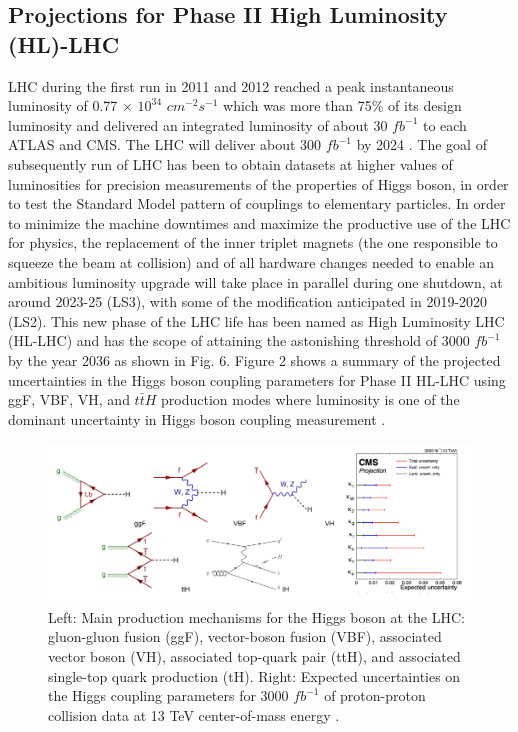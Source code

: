 \subsection{Projections for Phase II High Luminosity (HL)-LHC}
LHC during the first run in 2011 and 2012 reached a peak instantaneous luminosity of 0.77 $\times$ $10^{34}$ $cm^{-2}s^{-1}$ which was more than 75$\%$ of its design luminosity and delivered an integrated luminosity of about 30 $fb^{-1}$ to each ATLAS and CMS. The LHC will deliver about 300 $fb^{-1}$ by 2024 \cite{collaborations2019report}. The goal of subsequently run of LHC has been to obtain datasets at higher values of luminosities for precision measurements of the properties of Higgs boson, in order to test the Standard Model pattern of couplings to elementary particles. In order to minimize the machine downtimes and maximize the productive use of the LHC for physics, the replacement of the inner triplet magnets (the one responsible to squeeze the beam at collision) and  of  all  hardware  changes  needed  to  enable  an  ambitious  luminosity  upgrade  will  take  place in parallel during one shutdown, at around 2023-25 (LS3), with some of the modification anticipated in 2019-2020 (LS2). This new phase of the LHC life has been named as High Luminosity LHC (HL-LHC) and has the scope of attaining the astonishing threshold of 3000 $fb^{-1}$ by the year 2036 as shown in Fig. 6. Figure 2 shows a summary of the projected uncertainties in the Higgs boson coupling parameters for Phase II HL-LHC using ggF, VBF, VH, and ${t\bar{t}H}$ production modes where luminosity is one of the dominant uncertainty in Higgs boson coupling measurement \cite{Tanabashi:2018oca}. \\





\begin{figure}[H]
  \centering
  \includegraphics[width=1 \columnwidth]{./hig_pro.png}
  \caption{\onehalfspacing Left: Main production mechanisms for the Higgs boson at the LHC: gluon-gluon fusion (ggF), vector-boson fusion (VBF), associated vector boson (VH), associated top-quark pair (ttH), and associated single-top quark production (tH). Right: Expected uncertainties on the Higgs coupling parameters for 3000 $fb^{-1}$ of proton-proton collision data at 13 TeV center-of-mass energy \cite{Tanabashi:2018oca}.}
  \label{fig:LHC}
\end{figure}
